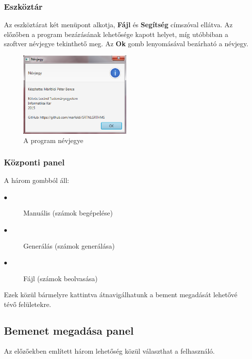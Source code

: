 \documentclass{elteikthesis}
\begin{document}
\subsubsection{Eszköztár}
Az eszköztárat két menüpont alkotja, \textbf{Fájl} és \textbf{Segítség} címszóval ellátva. Az előzőben a program bezárásának lehetősége kapott helyet, míg utóbbiban a szoftver névjegye tekinthető meg. Az \textbf{Ok} gomb lenyomásával bezárható a névjegy.
\begin{figure}[H]
	\centering
	\includegraphics[width=0.5\textwidth]{pics/about.png}
	\caption{A program névjegye}
\end{figure}\par

\subsubsection{Központi panel}
A három gombból áll:
\begin{description}
	\item[$\bullet$] Manuális (számok begépelése)
	\item[$\bullet$] Generálás (számok generálása) 
	\item[$\bullet$] Fájl (számok beolvasása)
\end{description}
Ezek közül bármelyre kattintva átnavigálhatunk a bement megadását lehetővé tévő felületekre.

\subsection{Bemenet megadása panel}
Az előzőekben említett három lehetőség közül választhat a felhasználó.
\end{document}
